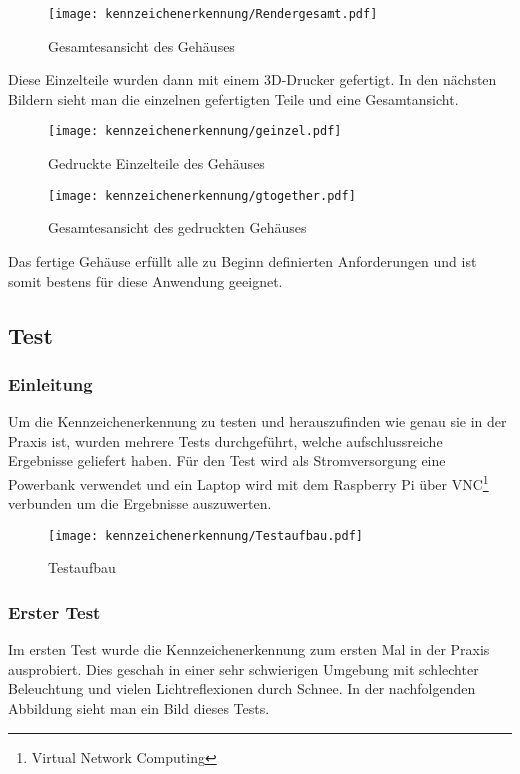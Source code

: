 \begin{figure}[H]
    \centering
    \texttt{[image: kennzeichenerkennung/Rendergesamt.pdf]}
    \caption{Gesamtesansicht des Gehäuses}
\end{figure}

Diese Einzelteile wurden dann mit einem 3D-Drucker gefertigt. In den nächsten Bildern sieht man die einzelnen gefertigten Teile und eine Gesamtansicht.

\begin{figure}[H]
    \centering
    \texttt{[image: kennzeichenerkennung/geinzel.pdf]}
    \caption{Gedruckte Einzelteile des Gehäuses}
\end{figure}

\begin{figure}[H]
    \centering
    \texttt{[image: kennzeichenerkennung/gtogether.pdf]}
    \caption{Gesamtesansicht des gedruckten Gehäuses}
\end{figure}

Das fertige Gehäuse erfüllt alle zu Beginn definierten Anforderungen und ist somit bestens für diese Anwendung geeignet.

\subsection{Test}

\subsubsection{Einleitung}
Um die Kennzeichenerkennung zu testen und herauszufinden wie genau sie in der Praxis ist, wurden mehrere Tests durchgeführt, welche aufschlussreiche Ergebnisse geliefert haben.
Für den Test wird als Stromversorgung eine Powerbank verwendet und ein Laptop wird mit dem Raspberry Pi über VNC\footnote{Virtual Network Computing} verbunden um die Ergebnisse auszuwerten.

\begin{figure}[H]
    \centering
    \texttt{[image: kennzeichenerkennung/Testaufbau.pdf]}
    \caption{Testaufbau}
\end{figure}

\subsubsection{Erster Test}
Im ersten Test wurde die Kennzeichenerkennung zum ersten Mal in der Praxis ausprobiert. Dies geschah in einer sehr schwierigen Umgebung mit schlechter Beleuchtung 
und vielen Lichtreflexionen durch Schnee. In der nachfolgenden Abbildung sieht man ein Bild dieses Tests.

